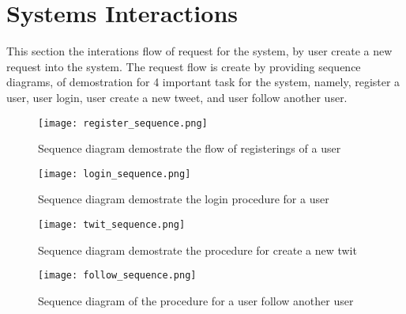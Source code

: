 \section{Systems Interactions}

This section the interations flow of request for the system, by user create a new request into the system. The request flow is create by providing sequence diagrams, of demostration for 4 important task for the system, namely, register a user, user login, user create a new tweet, and user follow another user. 



\begin{figure}[H]
	\centering
	\texttt{[image: register\_sequence.png]}
	\caption{Sequence diagram demostrate the flow of registerings of a user}
	\label{fig:register_sequence}
\end{figure}


\begin{figure}[H]
	\centering
	\texttt{[image: login\_sequence.png]}
	\caption{Sequence diagram demostrate the login procedure for a user}
	\label{fig:login_sequence}
\end{figure}

\begin{figure}[H]
	\centering
	\texttt{[image: twit\_sequence.png]}
	\caption{Sequence diagram demostrate the procedure for create a new twit}
	\label{fig:twit_sequence}
\end{figure}

\begin{figure}[H]
	\centering
	\texttt{[image: follow\_sequence.png]}
	\caption{Sequence diagram of the procedure for a user follow another user}
	\label{fig:follow_sequence}
\end{figure}

